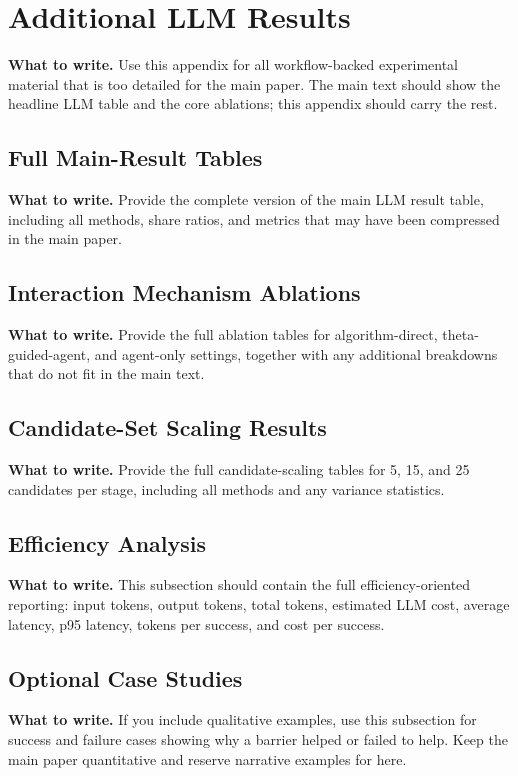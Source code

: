 \documentclass{article}
\newcommand{\towrite}[1]{\noindent\textbf{What to write.} #1}
\begin{document}
\section{Additional LLM Results}

\towrite{Use this appendix for all workflow-backed experimental material that is too detailed for the main paper. The main text should show the headline LLM table and the core ablations; this appendix should carry the rest.}

\subsection{Full Main-Result Tables}

\towrite{Provide the complete version of the main LLM result table, including all methods, share ratios, and metrics that may have been compressed in the main paper.}

\subsection{Interaction Mechanism Ablations}

\towrite{Provide the full ablation tables for algorithm-direct, theta-guided-agent, and agent-only settings, together with any additional breakdowns that do not fit in the main text.}

\subsection{Candidate-Set Scaling Results}

\towrite{Provide the full candidate-scaling tables for 5, 15, and 25 candidates per stage, including all methods and any variance statistics.}

\subsection{Efficiency Analysis}

\towrite{This subsection should contain the full efficiency-oriented reporting: input tokens, output tokens, total tokens, estimated LLM cost, average latency, p95 latency, tokens per success, and cost per success.}

\subsection{Optional Case Studies}

\towrite{If you include qualitative examples, use this subsection for success and failure cases showing why a barrier helped or failed to help. Keep the main paper quantitative and reserve narrative examples for here.}
\end{document}
